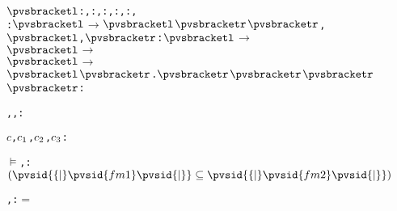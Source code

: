 \def\setsothermembertwofn#1#2{{(#1 \in #2)}}%
\def\opohtwofn#1#2{{#1\circ#2}}%
\def\opdividetwofn#1#2{{\frac{#1}{#2}}}%
\def\optimestwofn#1#2{{#1\times#2}}%
\def\opdifferenceonefn#1{{-#1}}%
\def\opdifferencetwofn#1#2{{#1-#2}}%
\def\opplustwofn#1#2{{#1+#2}}%
\begin{alltt}
\({\pvsbracketl}\): , : , : , : , : ,
               \pvsid{\{||\}}: \({\pvsbracketl}\) \(\rightarrow\) \({\pvsbracketl}\)\({\pvsbracketr}\)\({\pvsbracketr}\),
               \pvsid{(} \({\pvsbracketl}\), \({\pvsbracketr}\)\pvsid{)} \pvsid{[||]}: \({\pvsbracketl}\) \(\rightarrow\)
                                                              \({\pvsbracketl}\) \(\rightarrow\)
                                                                \({\pvsbracketl}\) \(\rightarrow\)
                                                                  \({\pvsbracketl}\)\({\pvsbracketr}\).\({\pvsbracketr}\)\({\pvsbracketr}\)\({\pvsbracketr}\)\({\pvsbracketr}\): 

  , , :  \vspace*{\pvsdeclspacing}

  \(c\), \(c\sb{1}\), \(c\sb{2}\), \(c\sb{3}\):  \vspace*{\pvsdeclspacing}

  \(\models\)\pvsid{(}, \pvsid{)}:  \pvskey{=} \(\setsothersubsetothertwofn{\pvsid{\{|}\pvsid{fm1}\pvsid{|\}}}{\pvsid{\{|}\pvsid{fm2}\pvsid{|\}}}\)\vspace*{\pvsdeclspacing}

  \pvsid{(}, \pvsid{)}:  \pvskey{=} \pvsid{\{|}\pvsid{|\}} \(=\) \pvsid{\{|}\pvsid{|\}}\vspace*{\pvsdeclspacing}


\end{alltt}
